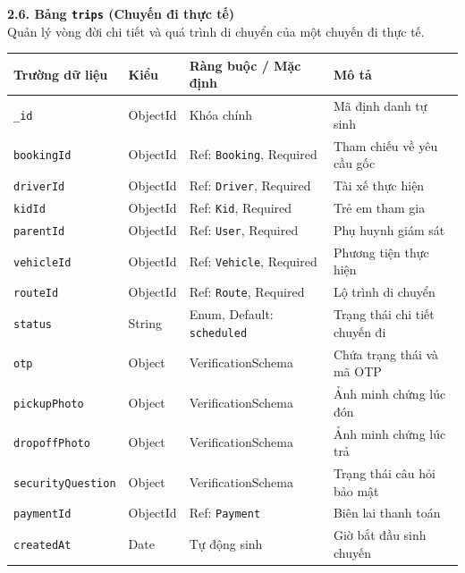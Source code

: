 \documentclass[../DoAn.tex]{subfiles}
\begin{document}
\textbf{2.6. Bảng \texttt{trips} (Chuyến đi thực tế)} \\
Quản lý vòng đời chi tiết và quá trình di chuyển của một chuyến đi thực tế.
\begin{table}[H]
    \centering
    \begin{tabular}{|l|l|p{4cm}|p{5cm}|}
        \hline
        \textbf{Trường dữ liệu}   & \textbf{Kiểu} & \textbf{Ràng buộc / Mặc định}     & \textbf{Mô tả}                \\ \hline
        \texttt{\_id}             & ObjectId      & Khóa chính                        & Mã định danh tự sinh          \\ \hline
        \texttt{bookingId}        & ObjectId      & Ref: \texttt{Booking}, Required   & Tham chiếu về yêu cầu gốc     \\ \hline
        \texttt{driverId}         & ObjectId      & Ref: \texttt{Driver}, Required    & Tài xế thực hiện              \\ \hline
        \texttt{kidId}            & ObjectId      & Ref: \texttt{Kid}, Required       & Trẻ em tham gia               \\ \hline
        \texttt{parentId}         & ObjectId      & Ref: \texttt{User}, Required      & Phụ huynh giám sát            \\ \hline
        \texttt{vehicleId}        & ObjectId      & Ref: \texttt{Vehicle}, Required   & Phương tiện thực hiện         \\ \hline
        \texttt{routeId}          & ObjectId      & Ref: \texttt{Route}, Required     & Lộ trình di chuyển            \\ \hline
        \texttt{status}           & String        & Enum, Default: \texttt{scheduled} & Trạng thái chi tiết chuyến đi \\ \hline
        \texttt{otp}              & Object        & VerificationSchema                & Chứa trạng thái và mã OTP     \\ \hline
        \texttt{pickupPhoto}      & Object        & VerificationSchema                & Ảnh minh chứng lúc đón        \\ \hline
        \texttt{dropoffPhoto}     & Object        & VerificationSchema                & Ảnh minh chứng lúc trả        \\ \hline
        \texttt{securityQuestion} & Object        & VerificationSchema                & Trạng thái câu hỏi bảo mật    \\ \hline
        \texttt{paymentId}        & ObjectId      & Ref: \texttt{Payment}             & Biên lai thanh toán           \\ \hline
        \texttt{createdAt}        & Date          & Tự động sinh                      & Giờ bắt đầu sinh chuyến       \\ \hline
    \end{tabular}
\end{table}
\end{document}

